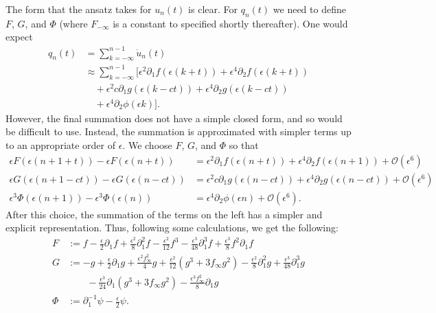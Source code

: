 The form that the ansatz takes for \(u_n(t)\) is clear. For \(q_n(t)\) we need to define \(F\), \(G\), and \(\Phi\) (where \(F_{-\infty}\) is a constant to specified shortly thereafter). One would expect  
\begin{equation*}
	\begin{aligned}
		q_n(t) &= \sum_{k=-\infty}^{n-1} \dot u_n(t) \\
		&\approx \sum_{k=-\infty}^{n-1} [ \epsilon^2 \partial_1 f (\epsilon(k+t) ) + \epsilon^4 \partial_2 f(\epsilon(k+t)) \\
		&\quad+ \epsilon^2 c \partial_1 g(\epsilon (k-ct))  +\epsilon^4 \partial_2 g(\epsilon(k-ct)) \\
		&\quad+ \epsilon^4 \partial_2 \phi(\epsilon k) ].
	\end{aligned}
\end{equation*}
However, the final summation does not have a simple closed form, and so would be difficult to use. Instead, the summation is approximated with simpler terms up to an appropriate order of \(\epsilon\). We choose \(F\), \(G\), and \(\Phi\) so that 
\begin{equation*}
	\begin{aligned}
		\epsilon F(\epsilon (n+1 + t)) - \epsilon F(\epsilon(n+t)) &= \epsilon^2 \partial_1 f(\epsilon(n+t)) + \epsilon^4 \partial_2 f(\epsilon (n+1)) + \mathcal O(\epsilon^6) \\
		\epsilon G(\epsilon(n+1 -ct)) - \epsilon G(\epsilon(n-ct)) &=  \epsilon^2 c \partial_1 g(\epsilon (n-ct))  +\epsilon^4 \partial_2 g(\epsilon(n-ct)) + \mathcal O(\epsilon^6) \\
		\epsilon^3 \Phi(\epsilon(n+1)) - \epsilon^3 \Phi(\epsilon(n)) &= \epsilon^4 \partial_2 \phi(\epsilon n) + \mathcal O(\epsilon^6) .
	\end{aligned}
\end{equation*}
After this choice, the summation of the terms on the left has a simpler and explicit representation. Thus, following some calculations, we get the following:
\begin{align}
	F &:= f - \frac{\epsilon} 2 \partial_1 f + \frac{\epsilon^2} 8 \partial_1^2 f - \frac{\epsilon^2}{12} f^3  - \frac{\epsilon^3}{48} \partial_1^3 f + \frac{\epsilon^3} 8 f^2 \partial_1 f\\
	G &:= - g + \frac{\epsilon}{2}\partial_1 g + \frac{\epsilon^2 f_\infty^2} 4  g + \frac{\epsilon^2}{12}(g^3 + 3f_\infty g^2) -\frac{ \epsilon^2} 8 \partial_1^2 g  + \frac{\epsilon^3}{48} \partial_1^3 g \\
	&\qquad - \frac{\epsilon^3}{24} \partial_1(g^3 + 3f_\infty g^2) - \frac{\epsilon^3 f_\infty^2} 8 \partial_1 g \nonumber \\
	\Phi &:=  \partial_1^{-1}\psi - \frac{\epsilon} 2 \psi.
\end{align}
